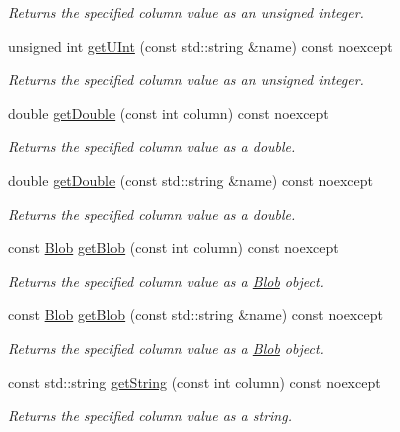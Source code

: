 \begin{DoxyCompactItemize}
\begin{DoxyCompactList}\small\item\em Returns the specified column value as an unsigned integer. \end{DoxyCompactList}\item 
unsigned int \hyperlink{a00010_a18315a8379249158c3f827441e8f6de0}{get\-U\-Int} (const std\-::string \&name) const noexcept
\begin{DoxyCompactList}\small\item\em Returns the specified column value as an unsigned integer. \end{DoxyCompactList}\item 
double \hyperlink{a00010_a679e56078c78e01c99fa08ad0b7ee782}{get\-Double} (const int column) const noexcept
\begin{DoxyCompactList}\small\item\em Returns the specified column value as a double. \end{DoxyCompactList}\item 
double \hyperlink{a00010_a45e9dd813439e8cda7608e18c1ccce5f}{get\-Double} (const std\-::string \&name) const noexcept
\begin{DoxyCompactList}\small\item\em Returns the specified column value as a double. \end{DoxyCompactList}\item 
const \hyperlink{a00002}{Blob} \hyperlink{a00010_a80028dc9f221648fe2398b40bd380c31}{get\-Blob} (const int column) const noexcept
\begin{DoxyCompactList}\small\item\em Returns the specified column value as a \hyperlink{a00002}{Blob} object. \end{DoxyCompactList}\item 
const \hyperlink{a00002}{Blob} \hyperlink{a00010_a4e50d9ec365c547b5edb7d062aeba72b}{get\-Blob} (const std\-::string \&name) const noexcept
\begin{DoxyCompactList}\small\item\em Returns the specified column value as a \hyperlink{a00002}{Blob} object. \end{DoxyCompactList}\item 
const std\-::string \hyperlink{a00010_a0920d021f6962f75e7b555e3f20fc0fc}{get\-String} (const int column) const noexcept
\begin{DoxyCompactList}\small\item\em Returns the specified column value as a string. \end{DoxyCompactList}\item 

\end{DoxyCompactItemize}
